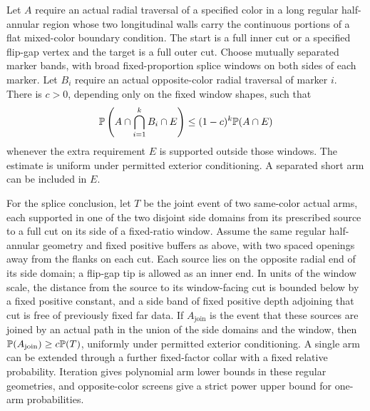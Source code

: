 \begin{lemma}
\label{lem:relative-arm}
Let $A$ require an actual radial traversal of a specified color in a
long regular half-annular region whose two longitudinal walls carry
the continuous portions of a flat mixed-color boundary condition.
The start is a full inner cut or a specified flip-gap vertex and
the target is a full outer cut. Choose mutually separated marker
bands, with broad fixed-proportion splice windows on both sides of
each marker. Let $B_i$ require an actual opposite-color radial
traversal of marker $i$. There is $c>0$, depending only on the fixed
window shapes, such that
\begin{equation}\label{disk:opposite-arm-loss}
 \mathbb P\left(A\cap\bigcap_{i=1}^k B_i\cap E\right)
 \le (1-c)^k\mathbb P(A\cap E)
\end{equation}
whenever the extra requirement $E$ is supported outside those
windows. The estimate is uniform under permitted exterior
conditioning. A separated short arm can be included in $E$.

For the splice conclusion, let $T$ be the joint event of two
same-color actual arms, each supported in one of the two disjoint
side domains from its prescribed source to a full cut on its side
of a fixed-ratio window. Assume the same regular half-annular
geometry and fixed positive buffers as above, with two spaced
openings away from the flanks on each cut. Each source lies on the
opposite radial end of its side domain; a flip-gap tip is allowed
as an inner end. In units of the window scale, the distance from
the source to its window-facing cut is bounded below by a fixed
positive constant, and a side band of fixed positive depth adjoining
that cut is free of previously fixed far data. If $A_{\mathrm{join}}$
is the event that these sources are joined by an actual path in
the union of the side domains and the window, then
$\mathbb P(A_{\mathrm{join}})\ge c\mathbb P(T)$, uniformly under permitted
exterior conditioning. A single arm can be extended through
a further fixed-factor collar with a fixed relative probability.
Iteration gives polynomial arm lower bounds in these regular
geometries, and opposite-color screens give a strict power upper
bound for one-arm probabilities.
\end{lemma}

